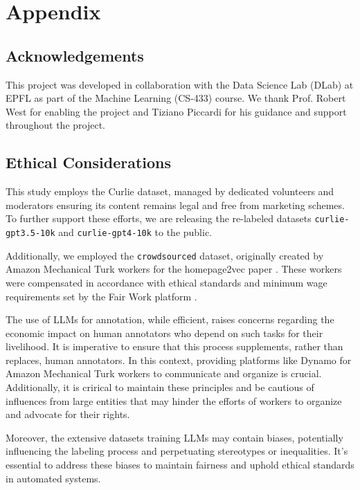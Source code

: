 \section{Appendix}

\subsection{Acknowledgements}\label{appendix:acknowledgements}

This project was developed in collaboration with the Data Science Lab (DLab) at EPFL as part of the Machine Learning (CS-433) course. We thank Prof. Robert West for enabling the project and Tiziano Piccardi for his guidance and support throughout the project.

\subsection{Ethical Considerations}\label{appendix:ethical-considerations}
This study employs the Curlie dataset, managed by dedicated volunteers and moderators ensuring its content remains legal and free from marketing schemes. 
To further support these efforts, we are releasing the re-labeled datasets \texttt{curlie-gpt3.5-10k} and \texttt{curlie-gpt4-10k} to the public.

Additionally, we employed the \texttt{crowdsourced} dataset, originally created by Amazon Mechanical Turk workers for the homepage2vec paper \cite{homepage2vec}. 
These workers were compensated in accordance with ethical standards and minimum wage requirements set by the Fair Work platform \cite{ethics2}.

The use of LLMs for annotation, while efficient, raises concerns regarding the economic impact on human annotators who depend on such tasks for their livelihood. 
It is imperative to ensure that this process supplements, rather than replaces, human annotators. In this context, providing platforms like Dynamo \cite{ethics1} for Amazon Mechanical Turk workers to communicate and organize is crucial.
Additionally, it is crirical to maintain these principles and be cautious of influences from large entities that may hinder the efforts of workers to organize and advocate for their rights.

Moreover, the extensive datasets training LLMs may contain biases, potentially influencing the labeling process and perpetuating stereotypes or inequalities. 
It's essential to address these biases to maintain fairness and uphold ethical standards in automated systems.


